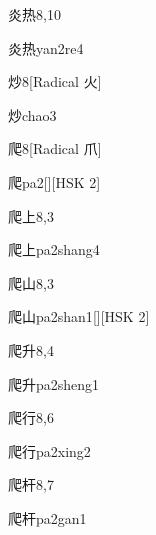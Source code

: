 \begin{entry}{炎热}{8,10}
  \begin{phonetics}{炎热}{yan2re4}
  \end{phonetics}
\end{entry}

\begin{entry}{炒}{8}[Radical ⽕]
  \begin{phonetics}{炒}{chao3}
  \end{phonetics}
\end{entry}

\begin{entry}{爬}{8}[Radical 爪]
  \begin{phonetics}{爬}{pa2}[][HSK 2]
  \end{phonetics}
\end{entry}

\begin{entry}{爬上}{8,3}
  \begin{phonetics}{爬上}{pa2shang4}
  \end{phonetics}
\end{entry}

\begin{entry}{爬山}{8,3}
  \begin{phonetics}{爬山}{pa2shan1}[][HSK 2]
  \end{phonetics}
\end{entry}

\begin{entry}{爬升}{8,4}
  \begin{phonetics}{爬升}{pa2sheng1}
  \end{phonetics}
\end{entry}

\begin{entry}{爬行}{8,6}
  \begin{phonetics}{爬行}{pa2xing2}
  \end{phonetics}
\end{entry}

\begin{entry}{爬杆}{8,7}
  \begin{phonetics}{爬杆}{pa2gan1}
  \end{phonetics}
\end{entry}

